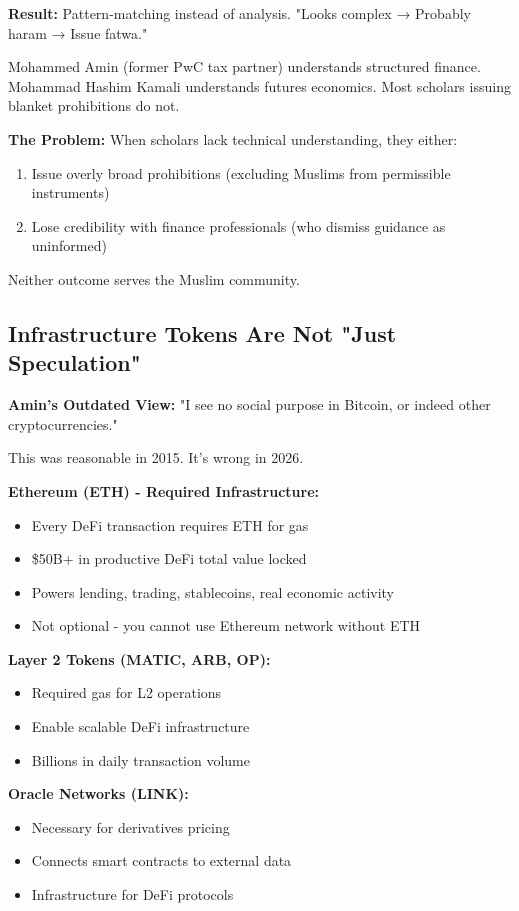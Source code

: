 \documentclass[10pt,twocolumn]{article}
\begin{document}
\textbf{Result:} Pattern-matching instead of analysis. "Looks complex → Probably haram → Issue fatwa."

Mohammed Amin (former PwC tax partner) understands structured finance. Mohammad Hashim Kamali understands futures economics. Most scholars issuing blanket prohibitions do not.

\textbf{The Problem:} When scholars lack technical understanding, they either:
\begin{enumerate}
    \item Issue overly broad prohibitions (excluding Muslims from permissible instruments)
    \item Lose credibility with finance professionals (who dismiss guidance as uninformed)
\end{enumerate}

Neither outcome serves the Muslim community.

\subsection{Infrastructure Tokens Are Not "Just Speculation"}

\textbf{Amin's Outdated View:} "I see no social purpose in Bitcoin, or indeed other cryptocurrencies."

This was reasonable in 2015. It's wrong in 2026.

\textbf{Ethereum (ETH) - Required Infrastructure:}
\begin{itemize}
    \item Every DeFi transaction requires ETH for gas
    \item \$50B+ in productive DeFi total value locked
    \item Powers lending, trading, stablecoins, real economic activity
    \item Not optional - you cannot use Ethereum network without ETH
\end{itemize}

\textbf{Layer 2 Tokens (MATIC, ARB, OP):}
\begin{itemize}
    \item Required gas for L2 operations
    \item Enable scalable DeFi infrastructure
    \item Billions in daily transaction volume
\end{itemize}

\textbf{Oracle Networks (LINK):}
\begin{itemize}
    \item Necessary for derivatives pricing
    \item Connects smart contracts to external data
    \item Infrastructure for DeFi protocols
\end{itemize}
\end{document}
